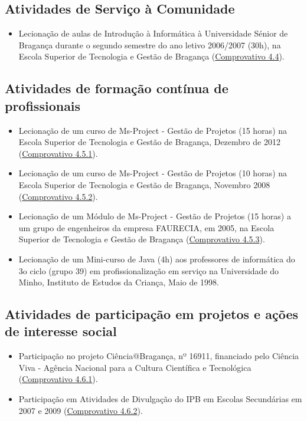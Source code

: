 \documentclass[11pt]{article}
\begin{document}
\subsection{Atividades de Serviço à Comunidade}
\begin{itemize}
\item {Lecionação de aulas de Introdução à Informática à Universidade Sénior de Bragança durante o segundo semestre do ano letivo 2006/2007 (30h), na Escola Superior de Tecnologia e Gestão de Bragança (\href{run:MissaoIPBoutros/univSenior.pdf}{Comprovativo 4.4}).}
\end{itemize} 

\subsection{Atividades de formação contínua de profissionais}
\begin{itemize}
\item {Lecionação de um curso de Ms-Project - Gestão de Projetos (15 horas) na Escola Superior de Tecnologia e Gestão de Bragança, Dezembro de 2012 (\href{run:MissaoIPBoutros/msproject2012.pdf}{Comprovativo 4.5.1}).}
\item {Lecionação de um curso de Ms-Project - Gestão de Projetos (10 horas) na Escola Superior de Tecnologia e Gestão de Bragança, Novembro 2008 (\href{run:MissaoIPBoutros/msproject2008.pdf}{Comprovativo 4.5.2}).}
\item {Lecionação de um Módulo de Ms-Project - Gestão de Projetos (15 horas) a um grupo de engenheiros da empresa FAURECIA, em 2005, na Escola Superior de Tecnologia e Gestão de Bragança (\href{run:MissaoIPBoutros/CursoFaurecia.pdf}{Comprovativo 4.5.3}).}
\item {Lecionação de um Mini-curso de Java (4h) aos professores de informática do 3o ciclo (grupo 39) em profissionalização em serviço na Universidade do Minho, Instituto de Estudos da Criança, Maio de 1998.}
\end{itemize}

\subsection{Atividades de participação em projetos e ações de interesse social}
\begin{itemize}
\item {Participação no projeto Ciência@Bragança, nº 16911, financiado pelo Ciência Viva - Agência Nacional para a Cultura Científica e Tecnológica (\href{run:MissaoIPBoutros/CienciaBraganca.pdf}{Comprovativo 4.6.1}).}
\item {Participação em Atividades de Divulgação do IPB em Escolas Secundárias em 2007 e 2009 (\href{run:MissaoIPBoutros/divulgacao.pdf}{Comprovativo 4.6.2}).}
\end{itemize}
\end{document}
